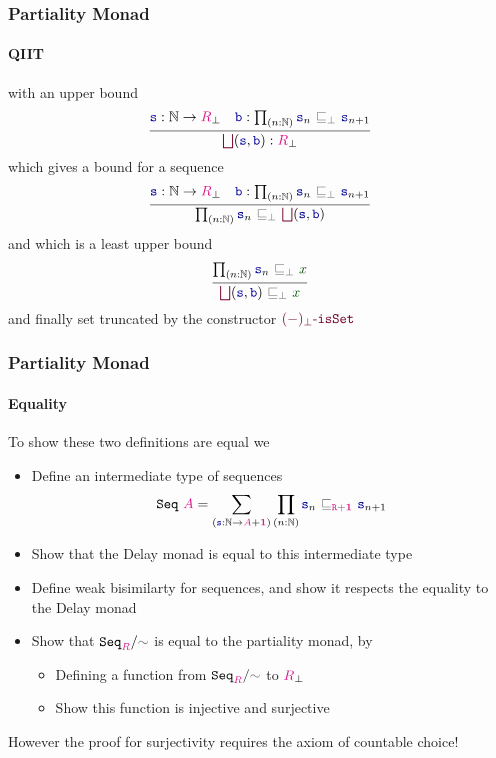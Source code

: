 \documentclass[xelatex,mathserif,serif,notheorems]{beamer} %
\theoremstyle{plain} %
\theoremstyle{definition}
\theoremstyle{remark}
\newcommand*{\term}[1]{\textcolor{green!30!black}{#1}} %
\newcommand*{\type}[1]{\textcolor{magenta!90!black}{#1}}
\newcommand*{\unit}{\type{\textbf{1}}}
\newcommand*{\relation}[1]{\textcolor{gray!75!black}{\ensuremath{\mathtt{#1}}}}
\newcommand*{\function}[1]{\textcolor{blue!60!black}{\ensuremath{\mathtt{#1}}}}
\newcommand*{\constructor}[1]{\textcolor{purple!60!black}{\ensuremath{\mathtt{#1}}}}
\newcommand*{\typeformer}[1]{\ensuremath{\mathtt{#1}}}
\begin{document}
\begin{frame}
  \frametitle{Partiality Monad}
  \framesubtitle{QIIT}
  with an upper bound
  \begin{equation}
    \vcenter{\infer{\constructor{\bigsqcup}(\function{s},\function{b}) : \type{R}_\bot}{\function{s} : \mathbb{N} \rightarrow \type{R}_\bot & \function{b} : \prod_{(n : \mathbb{N})} \function{s}_n~\relation{\sqsubseteq_{\bot}}~\function{s}_{n+1} }}
  \end{equation}
  which gives a bound for a sequence
  \begin{equation}
    \vcenter{\infer{\prod_{(n : \mathbb{N})} \function{s}_n~\relation{\sqsubseteq_{\bot}}~\constructor{\bigsqcup}(\function{s},\function{b})}{\function{s} : \mathbb{N} \rightarrow \type{R}_\bot & \function{b} : \prod_{(n : \mathbb{N})} \function{s}_n~\relation{\sqsubseteq_{\bot}}~\function{s}_{n+1} }}
  \end{equation}
  and which is a least upper bound
  \begin{equation}
    \vcenter{\infer{\constructor{\bigsqcup}(\function{s},\function{b})~\relation{\sqsubseteq_{\bot}}~\term{x}}{\prod_{(n:\mathbb{N})} \function{s}_n~\relation{\sqsubseteq_{\bot}}~\term{x}}}
  \end{equation}
  and finally set truncated by the constructor \(\constructor{(-)_\bot\text{-}isSet}\)
\end{frame}

\begin{frame}
  \frametitle{Partiality Monad}
  \framesubtitle{Equality}
  To show these two definitions are equal we
  \begin{itemize}
  \item Define an intermediate type of sequences
    \begin{equation}
      \typeformer{Seq}~\type{A} = \sum_{(\function{s} : \mathbb{N} \rightarrow \type{A} + \unit)}  \prod_{(n : \mathbb{N})} \function{s}_n~\relation{\sqsubseteq_{\type{R} + \unit}}~\function{s}_{n+1}
    \end{equation}
  \item Show that the Delay monad is equal to this intermediate type
  \item Define weak bisimilarty for sequences, and show it respects the equality to the Delay monad
  \item Show that \(\typeformer{Seq}_{\type{R}}/\relation{\sim}\) is equal to the partiality monad, by
    \begin{itemize}
    \item Defining a function from \(\typeformer{Seq}_{\type{R}}/\relation{\sim}\) to \(\type{R}_{\bot}\)
    \item Show this function is injective and surjective
    \end{itemize}
  \end{itemize}
  However the proof for surjectivity requires the axiom of countable choice!
\end{frame}
\end{document}
